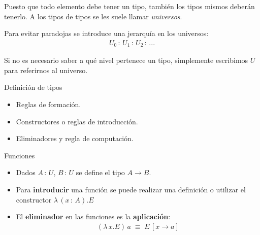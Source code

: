 \documentclass[xcolor=dvipsnames]{beamer} %
\newcommand{\tjud}[2]
  {\ensuremath{#1\,:\,#2}}
\begin{document}
\begin{frame}

    \begin{block}{}
     Puesto que todo elemento debe tener un tipo, también los tipos mismos deberán tenerlo. A los tipos de tipos
     se les suele llamar \textit{universos}.
    \end{block}
    
    \pause

    \begin{block}{}
     Para evitar paradojas se introduce una jerarquía en los universos:
     \begin{align*}
      \tjud{U_0}{\tjud{U_1}{\tjud{U_2}{...}}}
     \end{align*}
    \end{block}
    
    \pause
    
    \begin{block}{}
     Si no es necesario saber a qué nivel pertenece un tipo, simplemente escribimos $U$ para referirnos al universo.
    \end{block}
    
\end{frame}


\begin{frame}
  
  \begin{block}{Definición de tipos}
   \begin{itemize}
    \item Reglas de formación.
    \item Constructores o reglas de introducción.
    \item Eliminadores y regla de computación.
   \end{itemize}

  \end{block}

  \pause
  
  \begin{block}{Funciones}
   \begin{itemize}
    \item Dados $\tjud{A}{U}$, $\tjud{B}{U}$ se define el tipo $A \rightarrow B$.
    \item Para \textbf{introducir} una función se puede realizar una definición o utilizar
    el constructor $\lambda\,(\tjud{x}{A}).E$
    \item El \textbf{eliminador} en las funciones es la \textbf{aplicación}:
      \begin{align*}
        (\lambda\,x.E)\,a\;\equiv\;E\,[x \longrightarrow a]
      \end{align*}
   \end{itemize}

  \end{block}

\end{frame}
\end{document}
